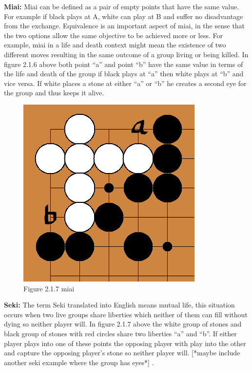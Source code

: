 \documentclass{l3proj}
\begin{document}
\textbf{Miai:} Miai can be defined as a pair of empty points that have the same value. For example if black plays at A, white can play at B and suffer no disadvantage from the exchange. Equivalence is an important aspect of miai, in the sense that the two options allow the same objective to be achieved more or less. For example, miai in a life and death context might mean the existence of two different moves resulting in the same outcome of a group living or being killed. In figure 2.1.6 above both point “a” and point “b” have the same value in terms of the life and death of the group if black plays at “a” then white plays at “b” and vice versa. If white places a stone at either “a” or “b” he creates a second eye for the group and thus keeps it alive.

\begin{figure}[H]
\centering
\includegraphics[scale=0.5]{Images/miai.png}
\caption{Figure 2.1.7 miai}
\end{figure}

\textbf{Seki:} The term Seki translated into English means mutual life, this situation occurs when two live groups share liberties which neither of them can fill without dying so neither player will.
 In figure 2.1.7 above the white group of stones and black group of stones with red circles share two liberties “a” and “b”. If either player plays into one of these points the opposing player with play into the other and capture the opposing player’s stone so neither player will. [*maybe include another seki example where the group has eyes*] .
\end{document}
